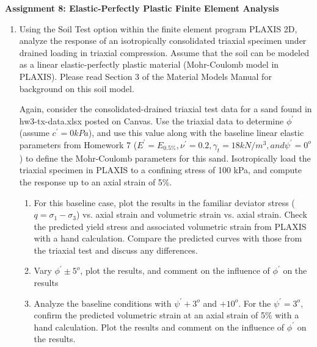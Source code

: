 \documentclass[a4paper,12pt]{article}
\begin{document}
\begin{centering}
	\textbf{
		Assignment 8: Elastic-Perfectly Plastic Finite Element Analysis\\
	}
\end{centering}

\vspace{1em}
 
\begin{enumerate}

	\item  Using the Soil Test option within the finite element program PLAXIS 2D, analyze the
	response of an isotropically consolidated triaxial specimen under drained loading in triaxial
	compression. Assume that the soil can be modeled as a linear elastic-perfectly plastic
	material (Mohr-Coulomb model in PLAXIS). Please read Section 3 of the Material Models
	Manual for background on this soil model.
	
	Again, consider the consolidated-drained triaxial test data for a sand found in hw3-tx-data.xlsx posted on Canvas. Use the triaxial data to determine $\phi^\prime$ (assume $c^\prime = 0 kPa$), and use this value along with the baseline linear elastic parameters from Homework 7 ($E^\prime = E_{0.5\%}, \nu^\prime = 0.2, \gamma_t = 18 kN/m^3, and \psi^\prime = 0^o$) to define the Mohr-Coulomb parameters for this sand.
	Isotropically load the triaxial specimen in PLAXIS to a confining stress of 100 kPa, and
	compute the response up to an axial strain of 5\%.
	
	\begin{enumerate}
		\item For this baseline case, plot the results in the familiar deviator stress ($q = \sigma_1 - \sigma_3$) vs. axial
		strain and volumetric strain vs. axial strain. Check the predicted yield stress and
		associated volumetric strain from PLAXIS with a hand calculation. Compare the
		predicted curves with those from the triaxial test and discuss any differences.
		
		\item Vary $\phi^\prime \pm 5^o$, plot the results, and comment on the influence of $\phi^\prime$ on the results

		\item Analyze the baseline conditions with $\psi^\prime + 3^o$ and $+10^o$. For the  $\psi^\prime = 3^o$, confirm the
		predicted volumetric strain at an axial strain of 5\% with a hand calculation. Plot the
		results and comment on the influence of $\phi^\prime$ on the results.
		

\end{enumerate}
\end{enumerate}
\end{document}
